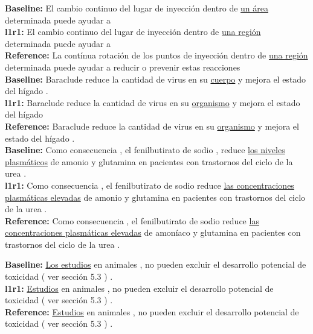 \documentclass[smallextended]{svjour3}       %
\theoremstyle{break}
\begin{document}
\begin{exe}
\footnotesize
\ex \textbf{Baseline:} El cambio continuo del lugar de inyección dentro de \underline{un área} determinada puede ayudar a \\
\textbf{l1r1:} El cambio continuo del lugar de inyección dentro de \underline{una región} determinada puede ayudar a \\
\textbf{Reference:} La contínua rotación de los puntos de inyección dentro de \underline{una región} determinada puede ayudar a reducir o prevenir estas reacciones \\
\noindent\makebox[\linewidth]{\rule{\linewidth}{0.4pt}}
\textbf{Baseline:} Baraclude reduce la cantidad de virus en su \underline{cuerpo} y mejora el estado del hígado . \\
\textbf{l1r1:} Baraclude reduce la cantidad de virus en su \underline{organismo} y mejora el estado del hígado  \\
\textbf{Reference:} Baraclude reduce la cantidad de virus en su \underline{organismo} y mejora el estado del hígado .
\\ 
\noindent\makebox[\linewidth]{\rule{\linewidth}{0.4pt}}
\textbf{Baseline:} Como consecuencia , el fenilbutirato de sodio , reduce \underline{los niveles plasmáticos} de amonio y glutamina en pacientes con trastornos del ciclo de la urea . \\
\textbf{l1r1:} Como consecuencia , el fenilbutirato de sodio reduce \underline{las concentraciones plasmáticas elevadas} de amonio y glutamina en pacientes con trastornos del ciclo de la urea .  \\
\textbf{Reference:} Como consecuencia , el fenilbutirato de sodio reduce \underline{las concentraciones plasmáticas elevadas} de amoníaco y glutamina en pacientes con trastornos del ciclo de la urea .
\label{ex:QAsynonym}
\end{exe}

\begin{exe}
\footnotesize
\ex \textbf{Baseline:} \underline{Los estudios} en animales , no pueden excluir el desarrollo potencial de toxicidad ( ver sección 5.3 ) . \\
\textbf{l1r1:} \underline{Estudios} en animales , no pueden excluir el desarrollo potencial de toxicidad ( ver sección 5.3 ) . \\
\textbf{Reference:} \underline{Estudios} en animales , no pueden excluir el desarrollo potencial de toxicidad ( ver sección 5.3 ) .
\label{ex:QAdrop}
\end{exe}
\end{document}
